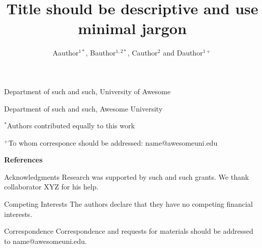 \documentclass{nature}
\title{Title should be descriptive and use minimal jargon}
\author{Aauthor$^{1*}$, Bauthor$^{1,2*}$, Cauthor$^{2}$ and Dauthor$^{1+}$}
\begin{document}
\maketitle

\begin{affiliations}
 \item Department of such and such, University of Awesome
 \item Department of such and such, Awesome University
 \item[] $^{*}$Authors contributed equally to this work
 \item[] $^{+}$To whom corresponce should be addressed: name@awesomeuni.edu
\end{affiliations}


\beginbodyfigures







{\bfseries References}





\begin{addendum}
 \item [Acknowledgments] Research was supported by such and such grants. We thank collaborator XYZ for his help.
 \item[Competing Interests] The authors declare that they have no competing financial interests.
 \item[Correspondence] Correspondence and requests for materials should be addressed to name@awesomeuni.edu.
\end{addendum}


\beginedfigures


\end{document}
